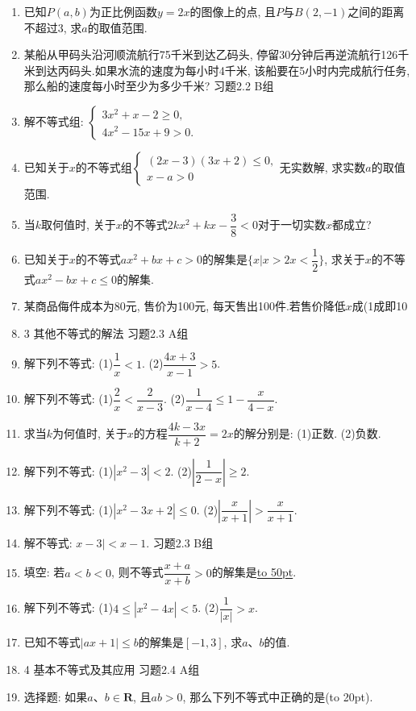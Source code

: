 \documentclass[10pt,a4paper]{article}
\newcommand{\blank}[1]{\underline{\hbox to #1pt{}}}
\newcommand{\bracket}[1]{(\hbox to #1pt{})}
\begin{document}
\begin{enumerate}[1.]
\item 已知$P(a,b)$为正比例函数$y=2x$的图像上的点, 且$P$与$B(2,-1)$之间的距离不超过3, 求$a$的取值范围.
\item 某船从甲码头沿河顺流航行75千米到达乙码头, 停留30分钟后再逆流航行126千米到达丙码头.如果水流的速度为每小时4千米, 该船要在5小时内完成航行任务, 那么船的速度每小时至少为多少千米?
习题2.2  B组
\item 解不等式组: $\begin{cases} 3x^2+x-2\ge 0, \\ 4x^2-15x+9>0. \end{cases}$
\item 已知关于$x$的不等式组$\begin{cases} (2x-3)(3x+2)\le 0, \\ x-a>0 \end{cases}$无实数解, 求实数$a$的取值范围.
\item 当$k$取何值时, 关于$x$的不等式$2kx^2+kx-\dfrac 38<0$对于一切实数$x$都成立?
\item 已知关于$x$的不等式$ax^2+bx+c>0$的解集是$\{x|x>2x<\dfrac 12\}$, 求关于$x$的不等式$ax^2-bx+c\le 0$的解集.
\item 某商品侮件成本为80元, 售价为100元, 每天售出100件.若售价降低$x$成(1成即10%
\item 3  其他不等式的解法
习题2.3  A组
\item 解下列不等式:
(1)$\dfrac 1x<1$.				(2)$\dfrac{4x+3}{x-1}>5$.
\item 解下列不等式:
(1)$\dfrac 2x<\dfrac 2{x-3}$.				(2)$\dfrac 1{x-4}\le 1-\dfrac x{4-x}$.
\item 求当$k$为何值时, 关于$x$的方程$\dfrac{4k-3x}{k+2}=2x$的解分别是:
(1)正数.					(2)负数.
\item 解下列不等式:
(1)$|x^2-3|<2$.				(2)$|\dfrac 1{2-x}|\ge 2$.
\item 解下列不等式:
(1)$|x^2-3x+2|\le 0$.			(2)$|\dfrac x{x+1}|>\dfrac x{x+1}$.
\item 解不等式: $x-3|<x-1$.
习题2.3  B组
\item 填空:
若$a<b<0$, 则不等式$\dfrac{x+a}{x+b}>0$的解集是\blank{50}.
\item 解下列不等式:
(1)$4\le|x^2-4x|<5$.			(2)$\dfrac 1{|x|}>x$.
\item 已知不等式$|ax+1|\le b$的解集是$[-1,3]$, 求$a$、$b$的值.
\item 4 基本不等式及其应用
习题2.4  A组
\item 选择题:
如果$a$、$b\in \mathbf{R}$, 且$ab>0$, 那么下列不等式中正确的是\bracket{20}.

\end{enumerate}
\end{document}
